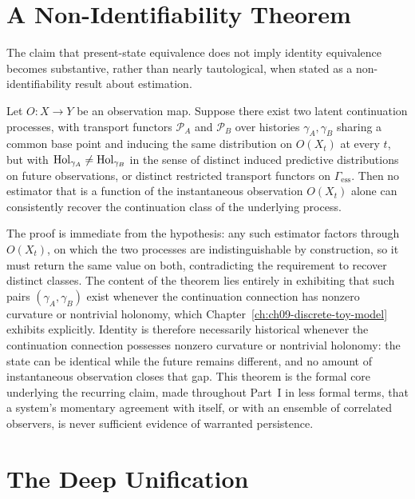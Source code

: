 \section{A Non-Identifiability Theorem}

The claim that present-state equivalence does not imply identity equivalence becomes substantive, rather than nearly tautological, when stated as a non-identifiability result about estimation.

\begin{theorem}
\label{thm:non-identifiability}
Let $O : X \to Y$ be an observation map. Suppose there exist two latent continuation processes, with transport functors $\mathcal{P}_A$ and $\mathcal{P}_B$ over histories $\gamma_A, \gamma_B$ sharing a common base point and inducing the same distribution on $O(X_t)$ at every $t$, but with $\operatorname{Hol}_{\gamma_A} \neq \operatorname{Hol}_{\gamma_B}$ in the sense of distinct induced predictive distributions on future observations, or distinct restricted transport functors on $\Gamma_{\mathrm{ess}}$. Then no estimator that is a function of the instantaneous observation $O(X_t)$ alone can consistently recover the continuation class of the underlying process.
\end{theorem}

The proof is immediate from the hypothesis: any such estimator factors through $O(X_t)$, on which the two processes are indistinguishable by construction, so it must return the same value on both, contradicting the requirement to recover distinct classes. The content of the theorem lies entirely in exhibiting that such pairs $(\gamma_A, \gamma_B)$ exist whenever the continuation connection has nonzero curvature or nontrivial holonomy, which Chapter~\ref{ch:ch09-discrete-toy-model} exhibits explicitly. Identity is therefore necessarily historical whenever the continuation connection possesses nonzero curvature or nontrivial holonomy: the state can be identical while the future remains different, and no amount of instantaneous observation closes that gap. This theorem is the formal core underlying the recurring claim, made throughout Part~I in less formal terms, that a system's momentary agreement with itself, or with an ensemble of correlated observers, is never sufficient evidence of warranted persistence.

\section{The Deep Unification}

